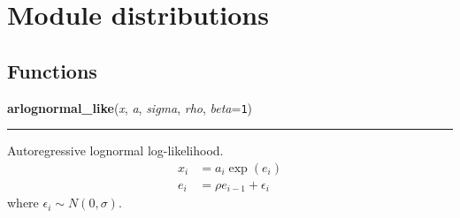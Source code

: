 %
%
%


\section{Module distributions}

    \label{distributions}


  \subsection{Functions}

    \label{pymc:distributions:arlognormal_like}

    \vspace{0.5ex}

\hspace{.8\funcindent}\begin{boxedminipage}{\funcwidth}

    \raggedright \textbf{arlognormal\_like}(\textit{x}, \textit{a}, \textit{sigma}, \textit{rho}, \textit{beta}={\tt 1})

    \vspace{-1.5ex}

    \rule{\textwidth}{1pt}
\setlength{\parskip}{2ex}

Autoregressive lognormal log-likelihood.
\begin{equation*}\begin{split}x_i & = a_i \exp(e_i) \\e_i & = \rho e_{i-1} + \epsilon_i\end{split}\end{equation*}
where $\epsilon_i \sim N(0,\sigma)$.
\setlength{\parskip}{1ex}
    \end{boxedminipage}

    \label{pymc:distributions:bernoulli_like}

